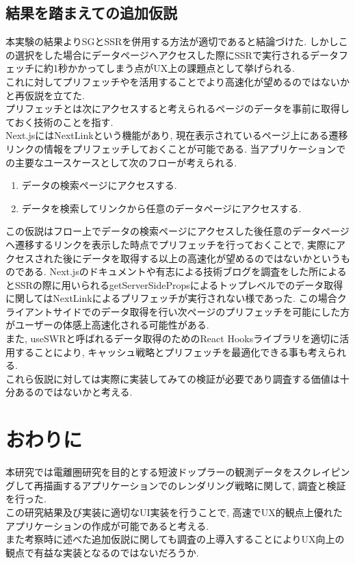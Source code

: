 \subsection{結果を踏まえての追加仮説}
本実験の結果よりSGとSSRを併用する方法が適切であると結論づけた.
しかしこの選択をした場合にデータページへアクセスした際にSSRで実行されるデータフェッチに約1秒かかってしまう点がUX上の課題点として挙げられる.\\
これに対してプリフェッチやを活用することでより高速化が望めるのではないかと再仮説を立てた.\\
プリフェッチとは次にアクセスすると考えられるページのデータを事前に取得しておく技術のことを指す.\\
Next.jsにはNextLinkという機能があり, 現在表示されているページ上にある遷移リンクの情報をプリフェッチしておくことが可能である.
当アプリケーションでの主要なユースケースとして次のフローが考えられる.\\
\begin{enumerate}
	\item データの検索ページにアクセスする.
	\item データを検索してリンクから任意のデータページにアクセスする.
\end{enumerate}
この仮説はフロー上でデータの検索ページにアクセスした後任意のデータページヘ遷移するリンクを表示した時点でプリフェッチを行っておくことで, 実際にアクセスされた後にデータを取得する以上の高速化が望めるのではないかというものである.
Next.jsのドキュメントや有志による技術ブログを調査をした所によるとSSRの際に用いられるgetServerSidePropsによるトップレベルでのデータ取得に関してはNextLinkによるプリフェッチが実行されない様であった.
この場合クライアントサイドでのデータ取得を行い次ページのプリフェッチを可能にした方がユーザーの体感上高速化される可能性がある.\\
また, useSWRと呼ばれるデータ取得のためのReact Hooksライブラリを適切に活用することにより, キャッシュ戦略とプリフェッチを最適化できる事も考えられる.\\
これら仮説に対しては実際に実装してみての検証が必要であり調査する価値は十分あるのではないかと考える.

\section{おわりに}
本研究では電離圏研究を目的とする短波ドップラーの観測データをスクレイピングして再描画するアプリケーションでのレンダリング戦略に関して, 調査と検証を行った.\\
この研究結果及び実装に適切なUI実装を行うことで, 高速でUX的観点上優れたアプリケーションの作成が可能であると考える.\\
また考察時に述べた追加仮説に関しても調査の上導入することによりUX向上の観点で有益な実装となるのではないだろうか.

